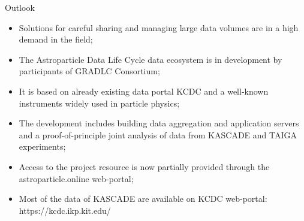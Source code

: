 \begin{frame}{Outlook}
    \begin{itemize}
      \setlength{\itemsep}{0pt}
	\item Solutions for careful sharing and managing large data volumes are in a high demand in the field;
        \item The Astroparticle Data Life Cycle data ecosystem is in development by participants of GRADLC Consortium;
        \item It is based on already existing data portal KCDC and a well-known instruments widely used in particle physics;
        \item The development includes building data aggregation and application servers and a proof-of-principle joint analysis of data from KASCADE and TAIGA experiments;
        \item Access to the project resource is now partially provided through the astroparticle.online web-portal;
        \item Most of the data of KASCADE are available on KCDC web-portal: \textcolor{kit-blue70}{https://kcdc.ikp.kit.edu/}


    \end{itemize}
\end{frame}

